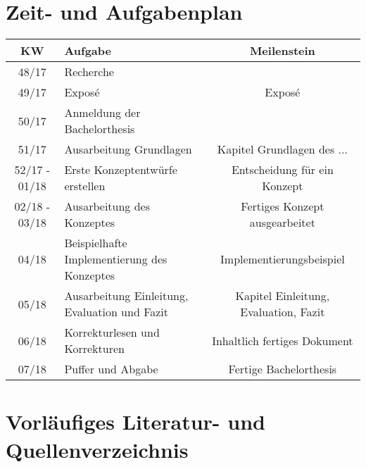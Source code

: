 \section{Zeit- und Aufgabenplan}
\begin{table}[H]
\begin{tabularx}{\textwidth}{ |c|X|c| }
  \hline
  KW & Aufgabe & Meilenstein  \\
  \hline 
  48/17  & Recherche &	\\ \hline
  49/17  & Exposé &	Exposé	\\ \hline
  50/17  & Anmeldung der Bachelorthesis &	\\ \hline
  51/17 & Ausarbeitung Grundlagen & Kapitel Grundlagen des ...   \\ \hline
  52/17 - 01/18 & Erste Konzeptentwürfe erstellen & Entscheidung für ein Konzept  \\ \hline
  02/18 - 03/18 & Ausarbeitung des Konzeptes & Fertiges Konzept ausgearbeitet   \\ \hline
  04/18 & Beispielhafte Implementierung des Konzeptes &   Implementierungsbeispiel \\ \hline
  05/18 & Ausarbeitung Einleitung, Evaluation und Fazit & Kapitel Einleitung, Evaluation, Fazit   \\ \hline
  06/18  & Korrekturlesen und Korrekturen  & Inhaltlich fertiges Dokument\\ \hline
  07/18  & Puffer und Abgabe & Fertige Bachelorthesis  \\
  \hline
\end{tabularx}
\end{table}
\section{Vorläufiges Literatur- und Quellenverzeichnis}
\nocite{*}
